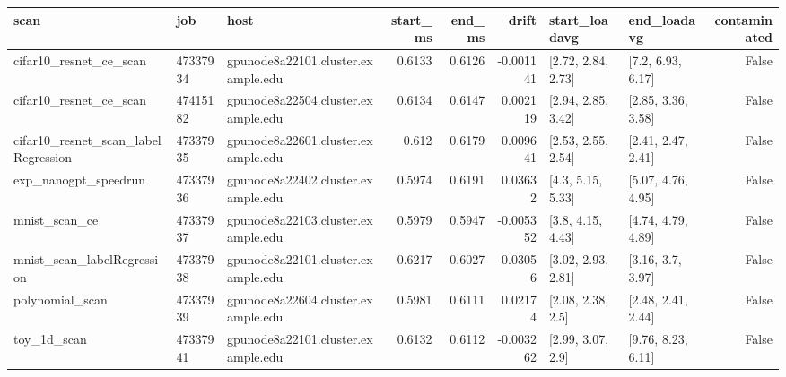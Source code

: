 \begin{tabular}{lllrrrllr}
\toprule
scan & job & host & start\_ms & end\_ms & drift & start\_loadavg & end\_loadavg & contaminated \\
\midrule
cifar10\_resnet\_ce\_scan & 47337934 & gpunode8a22101.cluster.example.edu & 0.6133 & 0.6126 & -0.001141 & [2.72, 2.84, 2.73] & [7.2, 6.93, 6.17] & False \\
cifar10\_resnet\_ce\_scan & 47415182 & gpunode8a22504.cluster.example.edu & 0.6134 & 0.6147 & 0.002119 & [2.94, 2.85, 3.42] & [2.85, 3.36, 3.58] & False \\
cifar10\_resnet\_scan\_labelRegression & 47337935 & gpunode8a22601.cluster.example.edu & 0.612 & 0.6179 & 0.009641 & [2.53, 2.55, 2.54] & [2.41, 2.47, 2.41] & False \\
exp\_nanogpt\_speedrun & 47337936 & gpunode8a22402.cluster.example.edu & 0.5974 & 0.6191 & 0.03632 & [4.3, 5.15, 5.33] & [5.07, 4.76, 4.95] & False \\
mnist\_scan\_ce & 47337937 & gpunode8a22103.cluster.example.edu & 0.5979 & 0.5947 & -0.005352 & [3.8, 4.15, 4.43] & [4.74, 4.79, 4.89] & False \\
mnist\_scan\_labelRegression & 47337938 & gpunode8a22101.cluster.example.edu & 0.6217 & 0.6027 & -0.03056 & [3.02, 2.93, 2.81] & [3.16, 3.7, 3.97] & False \\
polynomial\_scan & 47337939 & gpunode8a22604.cluster.example.edu & 0.5981 & 0.6111 & 0.02174 & [2.08, 2.38, 2.5] & [2.48, 2.41, 2.44] & False \\
toy\_1d\_scan & 47337941 & gpunode8a22101.cluster.example.edu & 0.6132 & 0.6112 & -0.003262 & [2.99, 3.07, 2.9] & [9.76, 8.23, 6.11] & False \\
\bottomrule
\end{tabular}
